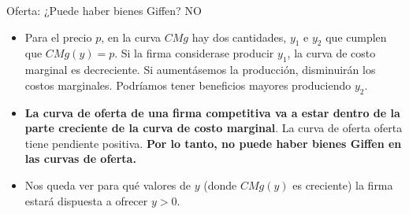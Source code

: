 \documentclass{beamer}
\theoremstyle{definition}
\begin{document}
\begin{frame}{Oferta: ¿Puede haber bienes Giffen? NO}
\begin{itemize}
\item Para el precio $p$, en la curva $CMg$ hay dos cantidades, $y_1$ e $y_2$ que cumplen que $CMg(y)=p$. Si la firma considerase producir $y_1$, la curva de costo marginal es decreciente. Si aumentásemos la producción, disminuirán los costos marginales. Podríamos tener beneficios mayores produciendo $y_2$. %

\item \textbf{La curva de oferta de una firma competitiva va a estar dentro de la parte creciente de la curva de costo marginal}. La curva de oferta oferta tiene pendiente positiva. \textbf{Por lo tanto, no puede haber bienes Giffen en las curvas de oferta.}
\item Nos queda ver para qué valores de $y$ (donde $CMg(y)$ es creciente) la firma estará dispuesta a ofrecer $y>0$. 
\end{itemize}
\end{frame}
\end{document}
